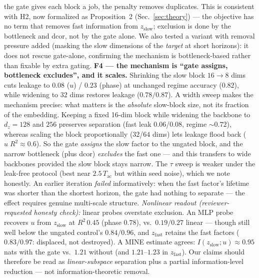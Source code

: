 \documentclass[10pt,twocolumn]{article}
\begin{document}
the gate gives each block a job, the penalty removes duplicates. This is
consistent with H2, now formalized as Proposition~2
(Sec.~\ref{sec:theory}) --- the objective has no term that removes fast
information from $z_{\mathrm{slow}}$; exclusion is done by the bottleneck and
dcor, not by the gate alone. We also tested a variant with removal pressure added
(masking the slow dimensions of the \emph{target} at short horizons): it does
not rescue gate-alone, confirming the mechanism is bottleneck-based rather
than fixable by extra gating.
\textbf{F4 --- the mechanism is ``gate assigns, bottleneck excludes'', and it
scales.} Shrinking the slow block $16\!\to\!8$ dims cuts leakage to $0.08$
($u$) / $0.23$ (phase) at unchanged regime accuracy ($0.82$), while widening
to $32$ dims restores leakage ($0.78/0.87$). A width sweep makes the mechanism
precise: what matters is the \emph{absolute} slow-block size, not its fraction
of the embedding. Keeping a fixed 16-dim block while widening the backbone to
$d_z{=}128$ and $256$ preserves separation (fast leak $0.06$/$0.08$, regime
$\sim\!0.72$), whereas scaling the block proportionally ($32$/$64$ dims) lets
leakage flood back ($u\;R^2\!\approx\!0.6$). So the gate \emph{assigns} the
slow factor to the ungated block, and the narrow bottleneck (plus dcor)
\emph{excludes} the fast one --- and this transfers to wide backbones provided
the slow block stays narrow. The $\tau$ sweep is weaker
under the leak-free protocol (best near $2.5\,T_{\mathrm{ac}}$ but within
seed noise), which we note honestly. An earlier iteration \emph{failed}
informatively: when the fast factor's lifetime was shorter than the shortest
horizon, the gate had nothing to separate --- the effect requires genuine
multi-scale structure.
\emph{Nonlinear readout (reviewer-requested honesty check):} linear probes
overstate exclusion. An MLP probe recovers $u$ from $z_{\mathrm{slow}}$ at
$R^2\,0.45$ (phase $0.78$), vs.\ $0.19/0.27$ linear --- though still well
below the ungated control's $0.84/0.96$, and $z_{\mathrm{fast}}$ retains the
fast factors ($0.83/0.97$: displaced, not destroyed). A MINE
\cite{belghazi2018mine} estimate agrees:
$I(z_{\mathrm{slow}};u)\!\approx\!0.95$ nats with the gate vs.\ $1.21$
without (and $1.21$--$1.23$ in $z_{\mathrm{fast}}$). Our claims should
therefore be read as \emph{linear-subspace} separation plus a partial
information-level reduction --- not information-theoretic removal.
\end{document}
